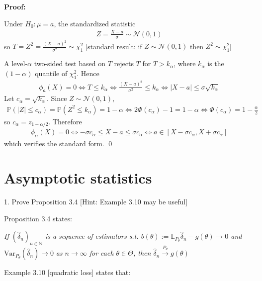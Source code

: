 \documentclass[10pt]{article}
\begin{document}
\textbf{Proof:}

Under $H_0: \mu = a $, the standardized statistic 
\begin{gather*}
    Z = \frac{X - a}{\sigma} \sim \mathcal{N}(0, 1)
\end{gather*}
so $T = Z^2 = \frac{(X - a)^2}{\sigma^2} \sim\chi_1^2 $ [standard result: if $Z \sim \mathcal{N}(0, 1)$ then $Z^2 \sim\chi_1^2 $]

A level-$\alpha $ two-sided test based on $T $ rejects $T $ for $T > k_\alpha $, where $k_\alpha $ is the $(1 - \alpha)$ quantile of $\chi_1^2 $. Hence 
\begin{gather*}
    \phi_a(X) = 0 \iff T \le k_\alpha \iff \frac{(X - a)^2}{\sigma^2} \le k_\alpha \iff |X - a| \le \sigma\sqrt{k_\alpha}
\end{gather*}
Let $c_\alpha = \sqrt{k_\alpha}$. Since $Z \sim \mathcal{N}(0, 1)$,
\begin{gather*}
    \mathbb{P}(|Z| \le c_\alpha) = \mathbb{P}(Z^2 \le k_\alpha) = 1 - \alpha \iff 2\Phi(c_\alpha) - 1 = 1 - \alpha \iff \Phi(c_\alpha) = 1 - \frac{\alpha}{2}
\end{gather*}
so $c_\alpha = z_{1 - \alpha / 2}$. Therefore
\begin{gather*}
    \phi_\alpha(X) = 0 \iff -\sigma c_\alpha \le X - a \le \sigma c_\alpha \iff a \in [X - \sigma c_\alpha, X + \sigma c_\alpha]
\end{gather*}
which verifies the standard form. \qed

\newpage

\section{Asymptotic statistics}

\hfill 

1. Prove Proposition 3.4 [Hint: Example 3.10 may be useful]

Proposition 3.4 states:

\textit{If $(\hat{\delta}_n)_{n\in \mathbb{N}}$ is a sequence of estimators s.t. $b(\theta) := \mathbb{E}_{P_\theta}\hat{\delta}_n - g(\theta)\to 0 $ and } $\text{Var}_{P_\theta}(\hat{\delta}_n)\to 0 $ \textit{ as $n \to \infty $ for each $\theta\in\Theta $, then $\hat{\delta}_n \xrightarrow{P_\theta}g(\theta)$}

Example 3.10 [quadratic loss] states that: 
\end{document}
